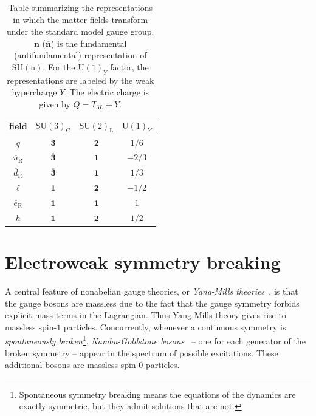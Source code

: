 \begin{table}
\centering
\begin{tabular}{c|ccc}\hline\hline
field &$\mathrm{SU(3)}_{\mathrm{C}}$&$\mathrm{SU(2)}_{\mathrm{L}}$&$\mathrm{U(1)}_Y$ \\\hline
$q$ & $\mathbf{3}$ & $\mathbf{2}$ & $1/6$\\
$\overline u_\mathrm{R}$ & $\mathbf{\overline 3}$ & $\mathbf{1}$ & $-2/3$\\
$\overline d_\mathrm{R}$ & $\mathbf{\overline 3}$ & $\mathbf{1}$ & $1/3$\\
$\ell$ & $\mathbf{1}$ & $\mathbf{2}$ & $-1/2$\\
$\overline e_\mathrm{R}$ & $\mathbf{1}$ & $\mathbf{1}$ & $1$\\\hline
$h$ & $\mathbf{1}$ & $\mathbf{2}$ & $1/2$\\
\hline\hline
\end{tabular}
\caption{\label{tab:representations} Table summarizing the
    representations in which the matter fields transform under the standard
    model gauge group. $\mathbf{n}$ ($\mathbf{\overline n}$) is the
    fundamental (antifundamental) representation
    of $\mathrm{SU(n)}$. For the $\mathrm{U(1)}_Y$ factor, the
    representations are labeled by the weak hypercharge $Y$. The electric charge is given by $Q = T_{3L}+Y$. }
\end{table}


\section{Electroweak symmetry breaking}
\label{sec:ewsb}
A central feature of nonabelian gauge theories, or \emph{Yang-Mills theories}~\cite{Yang:1954ek}, is that the gauge bosons are
massless due to the fact that the gauge symmetry forbids explicit mass
terms in the Lagrangian. Thus Yang-Mills theory gives rise to massless
spin-$1$ particles. Concurrently, whenever a continuous
symmetry is \emph{spontaneously broken}\footnote{Spontaneous symmetry
  breaking means the equations of the dynamics are exactly symmetric,
  but they admit solutions that are not.}, \emph{Nambu-Goldstone
bosons}~\cite{Nambu:1960tm,Goldstone:1961eq} -- one for each generator of the broken symmetry -- appear in the spectrum of possible
excitations. These additional bosons are massless spin-$0$ particles. 

